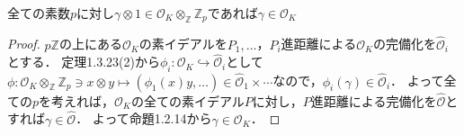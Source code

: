 \begin{screen}
  全ての素数$p$に対し$\gamma \otimes 1\in\mathcal{O}_K\otimes_\mathbb{Z}\mathbb{Z}_p$であれば$\gamma\in\mathcal{O}_K$
\end{screen}
\begin{proof}
  $p\mathbb{Z}$の上にある$\mathcal{O}_K$の素イデアルを$P_1, \ldots$，$P_i$進距離による$\mathcal{O}_K$の完備化を$\widehat{\mathcal{O}}_i$とする．
  定理1.3.23(2)から$\phi_i\colon\mathcal{O}_K\hookrightarrow\widehat{\mathcal{O}}_i$として$\phi\colon\mathcal{O}_K\otimes_\mathbb{Z}\mathbb{Z}_p\ni x\otimes y\mapsto(\phi_1(x)y, \ldots)\in\widehat{\mathcal{O}}_1\times\cdots$なので，$\phi_i(\gamma)\in\widehat{\mathcal{O}}_i$．
  よって全ての$p$を考えれば，$\mathcal{O}_K$の全ての素イデアル$P$に対し，$P$進距離による完備化を$\widehat{\mathcal{O}}$とすれば$\gamma \in \widehat{\mathcal{O}}$．
  よって命題1.2.14から$\gamma\in\mathcal{O}_K$．
\end{proof}

